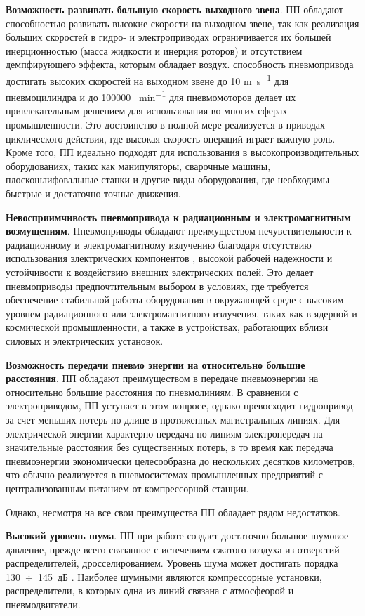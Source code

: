 \textbf{Возможность развивать большую скорость выходного звена}.
ПП обладают способностью развивать высокие скорости на выходном звене,
так как реализация больших скоростей в гидро- и электроприводах ограничивается их
большей инерционностью (масса жидкости и инерция роторов) и отсутствием демпфирующего
эффекта, которым обладает воздух. способность пневмопривода достигать высоких скоростей на выходном
звене до 10 \si{\metre\per\second} для пневмоцилиндра и до \num{100000} \si{\rotates\per\minute} для пневмомоторов
делает их привлекательным решением для использования во многих сферах промышленности.
Это достоинство в полной мере
реализуется в приводах циклического действия, где высокая скорость операций
играет важную роль. Кроме того, ПП идеально подходят для использования в
высокопроизводительных оборудованиях, таких как манипуляторы, сварочные машины,
плоскошлифовальные станки и другие виды оборудования, где необходимы быстрые и достаточно точные движения.

\textbf{Невосприимчивость пневмопривода к радиационным и электромагнитным возмущениям}.
Пневмоприводы обладают преимуществом нечувствительности к радиационному и электромагнитному излучению
благодаря отсутствию использования электрических компонентов \cite{kasimov:a, kasimov:b}, высокой
рабочей надежности и устойчивости к
воздействию внешних электрических полей. Это делает пневмоприводы предпочтительным выбором в условиях,
где требуется обеспечение стабильной работы оборудования в окружающей среде с высоким уровнем радиационного или
электромагнитного излучения, таких как в ядерной и космической промышленности, а также в устройствах,
работающих вблизи силовых и электрических установок.

\textbf{Возможность передачи пневмо энергии на относительно большие расстояния}.
ПП обладают преимуществом в передаче пневмоэнергии на относительно большие расстояния по
пневмолиниям. В сравнении с электроприводом,
ПП уступает в этом вопросе, однако превосходит гидропривод за счет меньших
потерь по длине в протяженных магистральных линиях. Для электрической энергии характерно передача по линиям
электропередач на значительные расстояния без существенных потерь, в то время как передача пневмоэнергии
экономически целесообразна до нескольких десятков километров, что
обычно реализуется в пневмосистемах промышленных
предприятий с централизованным питанием от компрессорной станции.


Однако, несмотря на все свои преимущества ПП обладает рядом недостатков.

\textbf{Высокий уровень шума}.
ПП при работе создает достаточно большое шумовое давление, прежде всего связанное с
истечением сжатого воздуха из отверстий распределителей, дросселированием. Уровень шума может
достигать порядка 130~$\div$~145~дБ \cite{pr11092544}. Наиболее шумными являются
компрессорные установки, распределители, в которых одна из линий связана с атмосфеорой и
пневмодвигатели.


